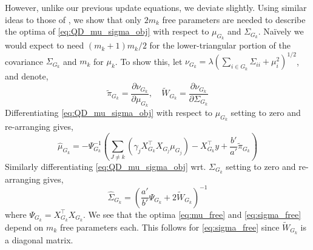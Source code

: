 However, unlike our previous update equations, we deviate slightly. Using similar ideas to those of \citep{Seeger1999, Opper2009}, we show that only $2m_k$ free parameters are needed to describe the optima of \eqref{eq:QD_mu_sigma_obj} with respect to $\mu_{G_k}$ and $\Sigma_{G_k}$. Na\"ively we would expect to need $(m_k + 1)m_k /2 $ for the lower-triangular portion of the covariance $\Sigma_{G_k}$ and $m_k$ for $\mu_k$. To show this, let $\nu_{G_k} = \lambda (\sum_{i \in G_k} \Sigma_{ii} + \mu^2_i)^{1/2}$, and denote,
\begin{equation*}
    \widetilde{\pi}_{G_k}
	=
	\frac{\partial \nu_{G_k}}{\partial \mu_{G_k}} 
    , \quad
    \widetilde{W}_{G_k} = 
	\frac{\partial \nu_{G_k}}{\partial \Sigma_{G_k}} 
\end{equation*}
Differentiating \eqref{eq:QD_mu_sigma_obj} with respect to $\mu_{G_k}$ 
setting to zero and re-arranging gives,
\begin{equation}  \label{eq:mu_free}
    \widehat{\mu}_{G_k} = 
- \Psi_{G_k}^{-1} \left(  \sum_{J \neq k} 
	\left( \gamma_j X_{G_k}^\top X_{G_j} \mu_{G_j} \right)
-
    X_{G_k}^\top y
+
    \frac{b'}{a'} \widetilde{\pi}_{G_k} \right)
\end{equation}
Similarly differentiating \eqref{eq:QD_mu_sigma_obj} wrt. $\Sigma_{G_k}$ 
setting to zero and re-arranging gives,
\begin{equation} \label{eq:sigma_free}
    \widehat{\Sigma}_{G_k} = 
    \left( 
	\frac{a'}{b'} \Psi_{G_k} + 2\widetilde{W}_{G_k}
    \right)^{-1}
\end{equation}
where $\Psi_{G_k} = X_{G_k}^\top X_{G_k}$. We see that the optima \eqref{eq:mu_free} and \eqref{eq:sigma_free} depend on $m_k$ free parameters each. This follows for \eqref{eq:sigma_free} since $\widetilde{W}_{G_k}$ is a diagonal matrix.
